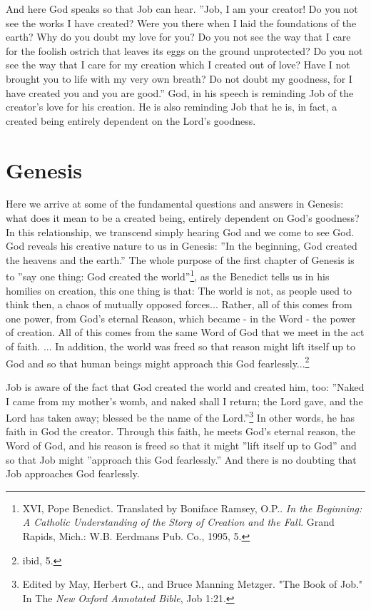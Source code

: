 And here God speaks so that Job can hear. ''Job, I am your creator! Do you not see the works I have created? Were you there when I laid the foundations of the earth? Why do you doubt my love for you? Do you not see the way that I care for the foolish ostrich that leaves its eggs on the ground unprotected? Do you not see the way that I care for my creation which I created out of love? Have I not brought you to life with my very own breath? Do not doubt my goodness, for I have created you and you are good.'' God, in his speech is reminding Job of the creator's love for his creation. He is also reminding Job that he is, in fact, a created being entirely dependent on the Lord's goodness.

	\section{Genesis}
Here we arrive at some of the fundamental questions and answers in Genesis: what does it mean to be a created being, entirely dependent on God's goodness? In this relationship, we transcend simply hearing God and we come to see God. God reveals his creative nature to us in Genesis: ''In the beginning, God created the heavens and the earth.'' The whole purpose of the first chapter of Genesis is to ''say one thing: God created the world''\footnote{XVI, Pope Benedict. Translated by Boniface Ramsey, O.P.. \emph{In the Beginning: A Catholic Understanding of the Story of Creation and the Fall}. Grand Rapids, Mich.: W.B. Eerdmans Pub. Co., 1995, 5.}, as the Benedict tells us in his homilies on creation, this one thing is that: 
The world is not, as people used to think then, a chaos of mutually opposed forces... Rather, all of this comes from one power, from God's eternal Reason, which became - in the Word - the power of creation. All of this comes from the same Word of God that we meet in the act of faith. ... In addition, the world was freed so that reason might lift itself up to God and so that human beings might approach this God fearlessly...\footnote{ibid, 5.}


Job is aware of the fact that God created the world and created him, too: ''Naked I came from my mother's womb, and naked shall I return; the Lord gave, and the Lord has taken away; blessed be the name of the Lord.''\footnote{Edited by May, Herbert G., and Bruce Manning Metzger. "The Book of Job." In The \emph{New Oxford Annotated Bible}, Job 1:21.} In other words, he has faith in God the creator. Through this faith, he meets God's eternal reason, the Word of God, and his reason is freed so that it might ''lift itself up to God'' and so that Job might ''approach this God fearlessly.'' And there is no doubting that Job approaches God fearlessly.

